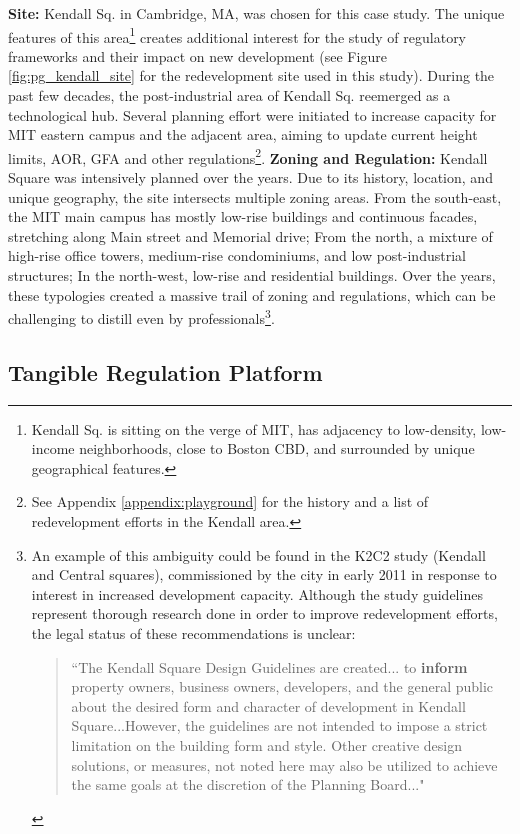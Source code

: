 {{        \textbf{Site:} Kendall Sq. in Cambridge, MA, was chosen for this case study. The unique features of this area\footnote{Kendall Sq. is sitting on the verge of MIT, has adjacency to low-density, low-income neighborhoods, close to Boston CBD, and surrounded by unique geographical features.} creates additional interest for the study of regulatory frameworks and their impact on new development (see Figure \eqref{fig:pg_kendall_site} for the redevelopment site used in this study). During the past few decades, the post-industrial area of Kendall Sq. reemerged as a technological hub. Several planning effort were initiated to increase capacity for MIT eastern campus and the adjacent area, aiming to update current height limits, AOR, GFA and other regulations\footnote{See Appendix \eqref{appendix:playground} for the history and a list of redevelopment efforts in the Kendall area.}.
        \newline
        \textbf{Zoning and Regulation:} Kendall Square was intensively planned over the years. Due to its history, location, and unique geography, the site intersects multiple zoning areas. From the south-east, the MIT main campus has mostly low-rise buildings and continuous facades, stretching along Main street and Memorial drive; From the north, a mixture of high-rise office towers, medium-rise condominiums, and low post-industrial structures; In the north-west, low-rise and residential buildings. Over the years, these typologies created a massive trail of zoning and regulations, which can be challenging to distill even by professionals\footnote{An example of this ambiguity could be found in the K2C2 study (Kendall and Central squares), commissioned by the city in early 2011 in response to interest in increased development capacity. Although the study guidelines represent thorough research done in order to improve redevelopment efforts, the legal status of these recommendations is unclear: \begin{quotation} ``The Kendall Square Design Guidelines are created... to \textbf{inform} property owners, business owners, developers, and the general public about the desired form and character of development in Kendall Square...However, the guidelines are not intended to impose a strict limitation on the building form and style. Other creative design solutions, or measures, not noted here may also be utilized to achieve the same goals at the discretion of the Planning Board..." \end{quotation}}.
    }

    \subsection{Tangible Regulation Platform}

}
